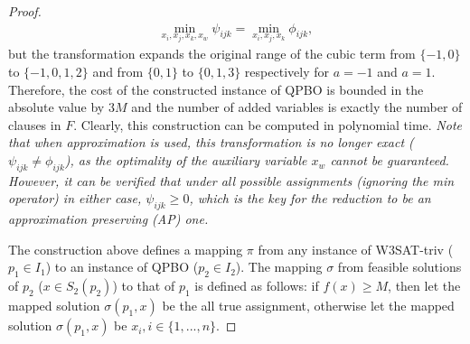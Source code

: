 \begin{proof}
\begin{align}
 \min_{x_i, x_j, x_k, x_w} \psi_{ijk} = \min_{x_i, x_j, x_k} \phi_{ijk},
\end{align}
but the transformation expands the original range of the cubic term from $\{-1, 0\}$ to $\{-1, 0, 1, 2\}$ and from $\{0, 1\}$ to $\{0, 1, 3\}$ respectively for $a = -1$ and $a = 1$. Therefore, the cost of the constructed instance of QPBO is bounded in the absolute value by $3M$ and the number of added variables is exactly the number of clauses in $F$. Clearly, this construction can be computed in polynomial time. {\em Note that when approximation is used, this transformation is no longer exact ($\psi_{ijk} \neq \phi_{ijk}$), as the optimality of the auxiliary variable $x_w$ cannot be guaranteed. However, it can be verified that under all possible assignments (ignoring the min operator) in either case, $\psi_{ijk} \geq 0$, which is the key for the reduction to be an approximation preserving (AP) one.}

The construction above defines a mapping $\pi$ from any instance of W3SAT-triv ($p_1 \in I_1$) to an instance of QPBO ($p_2 \in I_2$). The mapping $\sigma$ from feasible solutions of $p_2$ ($x \in S_2(p_2)$) to that of $p_1$ is defined as follows: if $f(x) \geq M$, then let the mapped solution $\sigma(p_1, x)$ be the all true assignment, otherwise let the mapped solution $\sigma(p_1, x)$ be $x_i, i \in \{1, ..., n\}$. 


\end{proof}
